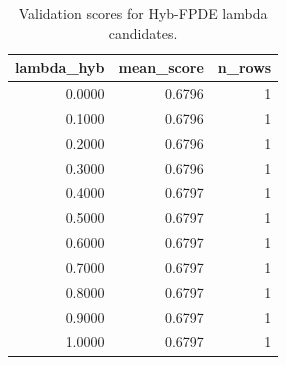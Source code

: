 \begin{table}[t]
\caption{Validation scores for Hyb-FPDE lambda candidates.}
\label{tab:lambda_distribution_computed}
\centering
\begin{tabular}{rrr}
\toprule
lambda\_hyb & mean\_score & n\_rows \\
\midrule
0.0000 & 0.6796 & 1 \\
0.1000 & 0.6796 & 1 \\
0.2000 & 0.6796 & 1 \\
0.3000 & 0.6796 & 1 \\
0.4000 & 0.6797 & 1 \\
0.5000 & 0.6797 & 1 \\
0.6000 & 0.6797 & 1 \\
0.7000 & 0.6797 & 1 \\
0.8000 & 0.6797 & 1 \\
0.9000 & 0.6797 & 1 \\
1.0000 & 0.6797 & 1 \\
\bottomrule
\end{tabular}

\end{table}
